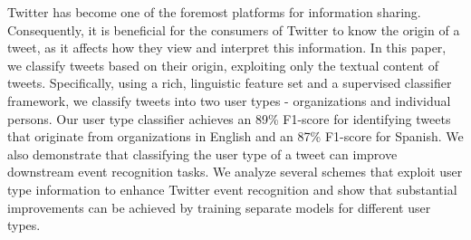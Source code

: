Twitter has become one of the foremost platforms for information sharing. Consequently, it is beneficial for the consumers of Twitter to know the origin of a tweet, as it affects how they view and interpret this information. In this paper, we classify tweets based on their origin, exploiting only the textual content of tweets. Specifically, using a rich, linguistic feature set and a supervised classifier framework, we classify tweets into two user types - organizations and individual persons. Our user type classifier achieves an 89\% F1-score for identifying tweets that originate from organizations in English and an 87\% F1-score for Spanish. We also demonstrate that classifying the user type of a tweet can improve downstream event recognition tasks. We analyze several schemes that exploit user type information to enhance Twitter event recognition and show that substantial improvements can be achieved by training separate models for different user types.
